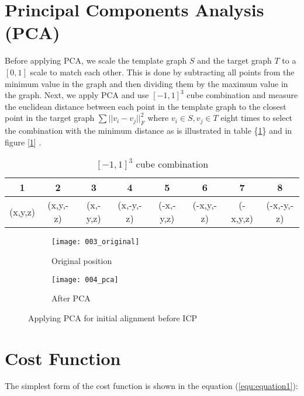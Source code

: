 \documentclass[../structure.tex]{subfiles}
\begin{document}
\section{Principal Components Analysis (PCA)}
\hspace{2em}Before applying PCA, we scale the template graph $S$ and the target graph $T$ to a $[0,1]$ scale to match each other. This is done by subtracting all points from the minimum value in the graph and then dividing them by the maximum value in the graph. Next, we apply PCA and use $[-1,1]^3$ cube combination and measure the euclidean distance between each point in the template graph to the closest point in the target graph $\sum ||v_i-v_j||_F^2$ where $v_i \in S, v_j \in T$ eight times to select the combination with the minimum distance as is illustrated in table \{\ref{table:cube}\} and in figure [\ref{fig:pca}] .
\vspace{2em}
\begin{center}
\begin{table}[h]
	\begin{tabular}{| c | c | c | c | c | c | c | c |}
	\hline
	1 & 2 & 3 & 4 & 5 & 6 & 7 & 8\\
	\hline
	(x,y,z) & (x,y,-z) & (x,-y,z) & (x,-y,-z) & (-x,-y,z) & (-x,y,-z) & (-x,y,z) & (-x,-y,-z)\\
	\hline
	\end{tabular}
\caption{$[-1,1]^3$ cube combination}
\label{table:cube}
\end{table}
\end{center}
\vspace{2em}
\begin{figure}[h!]
	\centering
	\begin{subfigure}[b]{0.59\textwidth}
	\texttt{[image: 003\_original]}
	\caption{Original position}
	\end{subfigure}
	\begin{subfigure}[b]{0.39\textwidth}
	\texttt{[image: 004\_pca]}
	\caption{After PCA}
	\end{subfigure}
\caption{Applying PCA for initial alignment before ICP}
\label{fig:pca}
\end{figure}

\vspace{2em}
\section{Cost Function}
\hspace{2em}The simplest form of the cost function is shown in the equation (\ref{equ:equation1}):
\end{document}
